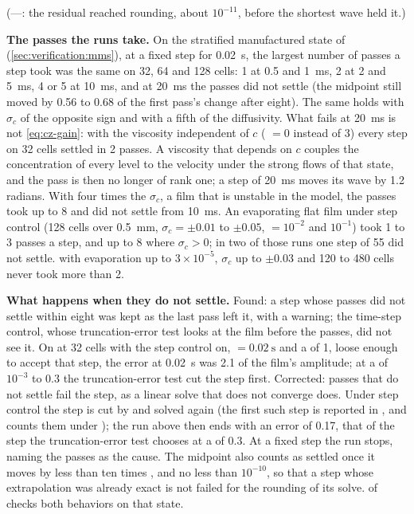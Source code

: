 (---: the residual reached rounding, about $10^{-11}$, before the shortest wave held it.)

\textbf{The passes the runs take.} On the stratified manufactured state of
 (\cref{sec:verification:mms}), at a fixed step for
\SI{0.02}{\second}, the largest number of passes a step took was the same on
32, 64 and 128 cells: 1 at 0.5 and \SI{1}{\milli\second}, 2 at
2 and \SI{5}{\milli\second}, 4 or 5 at \SI{10}{\milli\second}, and at
\SI{20}{\milli\second} the passes did not settle (the midpoint still moved by
0.56 to 0.68 of the first pass's change after eight). The same holds with
$\sigma_c$ of the opposite sign and with a fifth of the diffusivity. What
fails at \SI{20}{\milli\second} is not \cref{eq:cz-gain}: with the viscosity
independent of $c$ ( $=0$ instead of 3) every
step on 32 cells settled in 2 passes. A viscosity that depends on $c$ couples the
concentration of every level to the velocity under the strong flows of that
state, and the pass is then no longer of rank one; a step of
\SI{20}{\milli\second} moves its wave by 1.2 radians. With four times the
$\sigma_c$, a film that is unstable in the model, the passes took up to 8 and
did not settle from \SI{10}{\milli\second}. An evaporating flat film under
step control (128 cells over \SI{0.5}{\milli\metre}, $\sigma_c = \pm0.01$ to
$\pm0.05$,  $=10^{-2}$ and $10^{-1}$) took 1 to 3 passes a step,
and up to 8 where $\sigma_c > 0$; in two of those runs one step of 55 did not
settle.  with evaporation up to
$3\times10^{-5}$, $\sigma_c$ up to $\pm0.03$ and 120 to 480 cells never took
more than 2.

\textbf{What happens when they do not settle.} Found: a step whose passes
did not settle within eight was kept as the last pass left it, with a
warning; the time-step control, whose truncation-error test looks at the film
before the passes, did not see it. On  at 32 cells with
the step control on,  $=\SI{0.02}{\second}$ and a
 of 1, loose enough to accept that step, the error at
\SI{0.02}{\second} was 2.1 of the film's amplitude; at a  of
$10^{-3}$ to 0.3 the truncation-error test cut the step first. Corrected:
passes that do not settle fail the step, as a linear solve that does not
converge does. Under step control the step is cut by  and
solved again (the first such step is reported in , and
 counts them under ); the run above then ends with an error of 0.17, that of the step
the truncation-error test chooses at a  of 0.3. At a fixed
step the run stops, naming the passes as the cause. The midpoint also counts
as settled once it moves by less than ten times
, and no less than
$10^{-10}$, so that a step whose extrapolation was already exact is not
failed for the rounding of its solve.  of
 checks both behaviors on that state.

